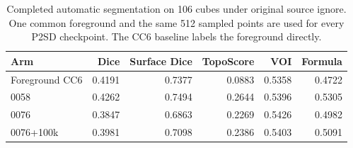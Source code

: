 \begin{table}[t]
\centering
\small
\setlength{\tabcolsep}{4pt}
\begin{tabular}{lrrrrr}
\toprule
Arm & Dice & Surface Dice & TopoScore & VOI & Formula \\
\midrule
Foreground CC6 & 0.4191 & 0.7377 & 0.0883 & 0.5358 & 0.4722 \\
0058 & 0.4262 & 0.7494 & 0.2644 & 0.5396 & 0.5305 \\
0076 & 0.3847 & 0.6863 & 0.2269 & 0.5426 & 0.4982 \\
0076+100k & 0.3981 & 0.7098 & 0.2386 & 0.5403 & 0.5091 \\
\bottomrule
\end{tabular}
\caption{Completed automatic segmentation on 106 cubes under original source ignore. One common foreground and the same 512 sampled points are used for every P2SD checkpoint. The CC6 baseline labels the foreground directly.}
\label{tab:auto}
\end{table}
